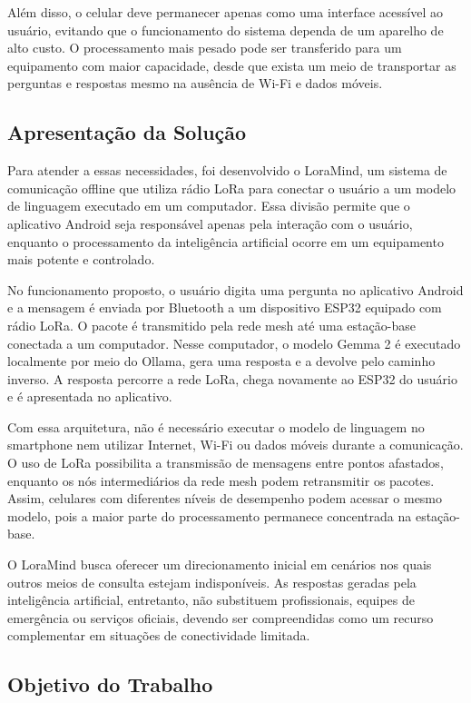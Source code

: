 \documentclass[12pt]{article}
\begin{document}
Além disso, o celular deve permanecer apenas como uma interface acessível ao usuário, evitando que o funcionamento do sistema dependa de um aparelho de alto custo. O processamento mais pesado pode ser transferido para um equipamento com maior capacidade, desde que exista um meio de transportar as perguntas e respostas mesmo na ausência de Wi-Fi e dados móveis.

\subsection*{Apresentação da Solução}

Para atender a essas necessidades, foi desenvolvido o LoraMind, um sistema de comunicação offline que utiliza rádio LoRa para conectar o usuário a um modelo de linguagem executado em um computador. Essa divisão permite que o aplicativo Android seja responsável apenas pela interação com o usuário, enquanto o processamento da inteligência artificial ocorre em um equipamento mais potente e controlado.

No funcionamento proposto, o usuário digita uma pergunta no aplicativo Android e a mensagem é enviada por Bluetooth a um dispositivo ESP32 equipado com rádio LoRa. O pacote é transmitido pela rede mesh até uma estação-base conectada a um computador. Nesse computador, o modelo Gemma 2 é executado localmente por meio do Ollama, gera uma resposta e a devolve pelo caminho inverso. A resposta percorre a rede LoRa, chega novamente ao ESP32 do usuário e é apresentada no aplicativo.

Com essa arquitetura, não é necessário executar o modelo de linguagem no smartphone nem utilizar Internet, Wi-Fi ou dados móveis durante a comunicação. O uso de LoRa possibilita a transmissão de mensagens entre pontos afastados, enquanto os nós intermediários da rede mesh podem retransmitir os pacotes. Assim, celulares com diferentes níveis de desempenho podem acessar o mesmo modelo, pois a maior parte do processamento permanece concentrada na estação-base.

O LoraMind busca oferecer um direcionamento inicial em cenários nos quais outros meios de consulta estejam indisponíveis. As respostas geradas pela inteligência artificial, entretanto, não substituem profissionais, equipes de emergência ou serviços oficiais, devendo ser compreendidas como um recurso complementar em situações de conectividade limitada.

\subsection*{Objetivo do Trabalho}
\end{document}

